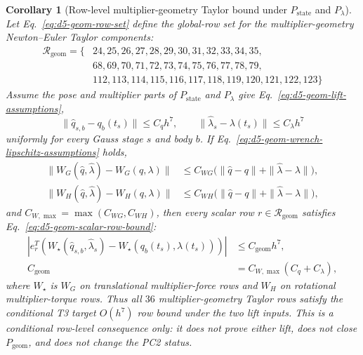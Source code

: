 \documentclass[preprint,12pt]{elsarticle}
\newtheorem{corollary}{Corollary}
\begin{document}
\begin{corollary}[Row-level multiplier-geometry Taylor bound under
\(P_{\mathrm{state}}\) and \(P_{\lambda}\)]
\label{cor:d5-geom-row-bound-under-lifts}
Let Eq.~\eqref{eq:d5-geom-row-set} define the global-row set for the
multiplier-geometry Newton--Euler Taylor components:
\begin{equation}
\label{eq:d5-geom-row-set}
\begin{aligned}
\mathcal R_{\mathrm{geom}}=\{&
24,25,26,27,28,29,30,31,32,33,34,35,\\
&68,69,70,71,72,73,74,75,76,77,78,79,\\
&112,113,114,115,116,117,118,119,120,121,122,123\}
\end{aligned}
\end{equation}
Assume the pose and multiplier parts of
\(P_{\mathrm{state}}\) and \(P_{\lambda}\) give
Eq.~\eqref{eq:d5-geom-lift-assumptions},
\begin{equation}
\label{eq:d5-geom-lift-assumptions}
  \|\widehat q_{s,b}-q_b(t_s)\|\le C_qh^7,\qquad
  \|\widehat\lambda_s-\lambda(t_s)\|\le C_\lambda h^7
\end{equation}
uniformly for every Gauss stage \(s\) and body \(b\).  If
Eq.~\eqref{eq:d5-geom-wrench-lipschitz-assumptions} holds,
\begin{equation}
\label{eq:d5-geom-wrench-lipschitz-assumptions}
  \begin{aligned}
  \|W_G(\widehat q,\widehat\lambda)-W_G(q,\lambda)\|
  &\le C_{WG}\bigl(\|\widehat q-q\|+\|\widehat\lambda-\lambda\|\bigr),\\
  \|W_H(\widehat q,\widehat\lambda)-W_H(q,\lambda)\|
  &\le C_{WH}\bigl(\|\widehat q-q\|+\|\widehat\lambda-\lambda\|\bigr),
  \end{aligned}
\end{equation}
and \(C_{W,\max}=\max(C_{WG},C_{WH})\), then every scalar row
\(r\in\mathcal R_{\mathrm{geom}}\) satisfies
Eq.~\eqref{eq:d5-geom-scalar-row-bound}:
\begin{equation}
\label{eq:d5-geom-scalar-row-bound}
\begin{aligned}
  |e_r^T(W_\star(\widehat q_{s,b},\widehat\lambda_s)
        -W_\star(q_b(t_s),\lambda(t_s)))|
  &\le C_{\mathrm{geom}}h^7,\\
  C_{\mathrm{geom}}&=C_{W,\max}(C_q+C_\lambda),
\end{aligned}
\end{equation}
where \(W_\star\) is \(W_G\) on translational multiplier-force rows and
\(W_H\) on rotational multiplier-torque rows.  Thus all \(36\)
multiplier-geometry Taylor rows satisfy the conditional T3 target \(O(h^7)\)
row bound under the two lift inputs.  This is a conditional row-level consequence only: it
does not prove either lift, does not close \(P_{\mathrm{geom}}\), and does
not change the PC2 status.
\end{corollary}
\end{document}
